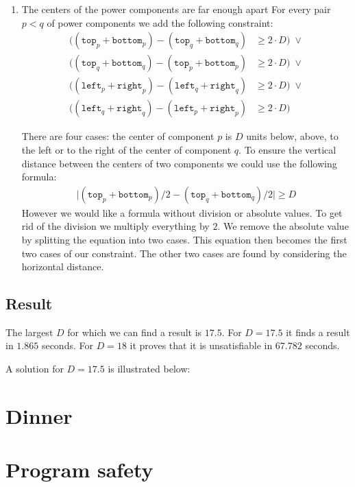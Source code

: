 \documentclass{scrartcl}
\begin{document}
\begin{enumerate}
	\item The centers of the power components are far enough apart
	For every pair $p < q$ of power components we add the following constraint:
	\begin{align*}
		((\mathtt{top}_p + \mathtt{bottom}_p) - (\mathtt{top}_q + \mathtt{bottom}_q) &\geq 2\cdot D)\;\lor\\
		((\mathtt{top}_q + \mathtt{bottom}_q) - (\mathtt{top}_p + \mathtt{bottom}_p) &\geq 2\cdot D)\;\lor\\
		((\mathtt{left}_p + \mathtt{right}_p) - (\mathtt{left}_q + \mathtt{right}_q) &\geq 2\cdot D)\;\lor\\
		((\mathtt{left}_q + \mathtt{right}_q) - (\mathtt{left}_p + \mathtt{right}_p) &\geq 2\cdot D)
	\end{align*}

	There are four cases: the center of component $p$ is $D$ units below, above, to the left or to the right of the center of component $q$. To ensure the vertical distance between the centers of two components we could use the following formula:
	\begin{align*}
		\lvert(\mathtt{top}_p + \mathtt{bottom}_p)/2 - (\mathtt{top}_q + \mathtt{bottom}_q)/2\rvert \geq D
	\end{align*}
	However we would like a formula without division or absolute values.
	To get rid of the division we multiply everything by $2$.
	We remove the absolute value by splitting the equation into two cases.
	This equation then becomes the first two cases of our constraint.
	The other two cases are found by considering the horizontal distance.
\end{enumerate}

\subsection{Result} %
\label{sub:result}
The largest $D$ for which we can find a result is $17.5$.
For $D=17.5$ it finds a result in $1.865$ seconds.
For $D=18$ it proves that it is unsatisfiable in $67.782$ seconds.

A solution for $D=17.5$ is illustrated below:
\begin{figure}[H]
	\centering
	
\end{figure}



\section{Dinner}


\section{Program safety}
\end{document}
